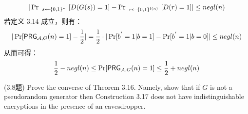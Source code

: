 \begin{questions}
\begin{solution}
\begin{equation}
                \begin{aligned}
                    |\Pr\ _{s\leftarrow{\set{0,1}^n}}\ [D(G(s))=1]-\Pr\ _{r\leftarrow{\set{0,1}^{l(n)}}}\ [D(r)=1]|\leq{negl}(n)
                \end{aligned}
            \end{equation}
            若定义 3.14 成立，则有：
            \begin{equation}
                \begin{aligned}
                    |\Pr[\mathsf{PRG}_{\mathcal{A},G}(n)=1]-\frac{1}{2}|=\frac{1}{2}\cdot|\Pr[{b}^{'}=1|b=1]-\Pr[{b}^{'}=1|b=0]|\leq{negl}(n)
                \end{aligned}
            \end{equation}
            从而可得：
            \begin{equation}
                \begin{aligned}
                    \frac{1}{2}-negl(n)\leq\Pr[\mathsf{PRG}_{\mathcal{A},G}(n)=1]\leq\frac{1}{2}+negl(n)
                \end{aligned}
            \end{equation}
        \end{solution}

    \question (3.8题) Prove the converse of Theorem 3.16. Namely, show that if $G$ is not a pseudorandom generator then Construction 3.17 does not have indistinguishable encryptions in the presence of an eavesdropper.


\end{questions}
